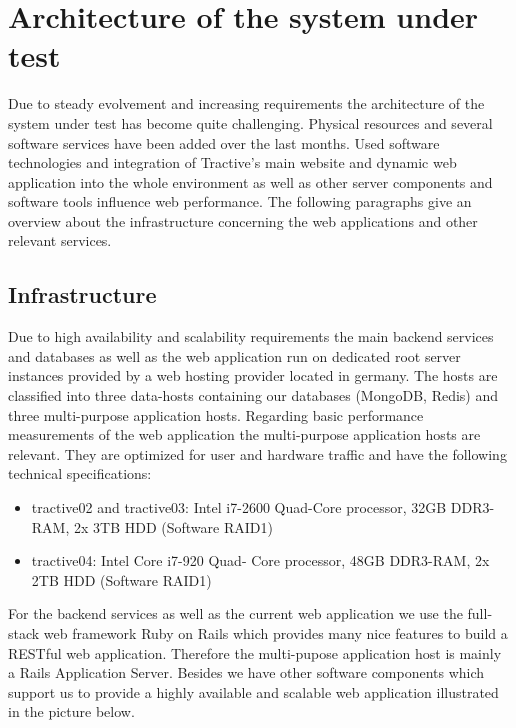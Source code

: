 \chapter{Architecture of the system under test}
\label{chap:architecture}

Due to steady evolvement and increasing requirements the architecture of the system under test has become quite challenging. Physical resources and several software services have been added over the last months. Used software technologies and integration of Tractive's main website and dynamic web application into the whole environment as well as other server components and software tools influence web performance. The following paragraphs give an overview about the infrastructure concerning the web applications and other relevant services.

\section{Infrastructure}
Due to high availability and scalability requirements the main backend services and databases as well as the web application run on dedicated root server instances provided by a web hosting provider located in germany. The hosts are classified into three data-hosts containing our databases (MongoDB, Redis) and three multi-purpose application hosts. Regarding basic performance measurements of the web application the multi-purpose application hosts are relevant. They are optimized for user and hardware traffic and have the following technical specifications:

\begin{itemize}
	\item{tractive02 and tractive03}: Intel i7-2600 Quad-Core processor, 32GB DDR3-RAM, 2x 3TB HDD (Software RAID1)
	\item{tractive04}: Intel Core i7-920 Quad- Core processor, 48GB DDR3-RAM, 2x 2TB HDD (Software RAID1)
\end{itemize}

For the backend services as well as the current web application we use the full-stack web framework Ruby on Rails which provides many nice features to build a RESTful web application. Therefore the multi-pupose application host is mainly a Rails Application Server. Besides we have other software components which support us to provide a highly available and scalable web application illustrated in the picture below. 

